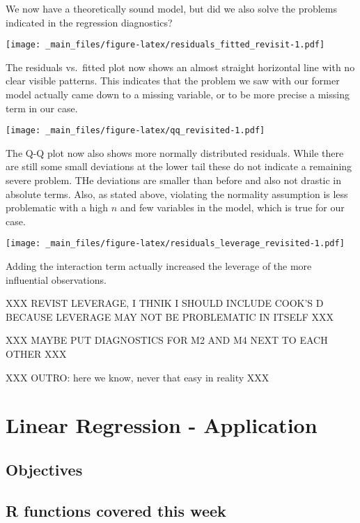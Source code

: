\documentclass[
]{book}
\begin{document}
We now have a theoretically sound model, but did we also solve the problems
indicated in the regression diagnostics?

\texttt{[image: \_main\_files/figure-latex/residuals\_fitted\_revisit-1.pdf]}

The residuals vs.~fitted plot now shows an almost straight horizontal line with
no clear visible patterns.
This indicates that the problem we saw with our former model actually came down
to a missing variable, or to be more precise a missing term in our case.

\texttt{[image: \_main\_files/figure-latex/qq\_revisited-1.pdf]}

The Q-Q plot now also shows more normally distributed residuals. While there are
still some small deviations at the lower tail these do not indicate a remaining
severe problem. THe deviations are smaller than before and also not drastic in
absolute terms. Also, as stated above, violating the normality assumption is less
problematic with a high \(n\) and few variables in the model, which is true for
our case.

\texttt{[image: \_main\_files/figure-latex/residuals\_leverage\_revisited-1.pdf]}

Adding the interaction term actually increased the leverage of the more
influential observations.

XXX REVIST LEVERAGE, I THNIK I SHOULD INCLUDE COOK'S D BECAUSE LEVERAGE MAY NOT BE PROBLEMATIC IN ITSELF XXX

XXX MAYBE PUT DIAGNOSTICS FOR M2 AND M4 NEXT TO EACH OTHER XXX

XXX OUTRO: here we know, never that easy in reality XXX

\hypertarget{lin-a}{%
\chapter{Linear Regression - Application}\label{lin-a}}

\hypertarget{objectives-2}{%
\section{Objectives}\label{objectives-2}}

\hypertarget{r-functions-covered-this-week-1}{%
\section{R functions covered this week}\label{r-functions-covered-this-week-1}}
\end{document}
